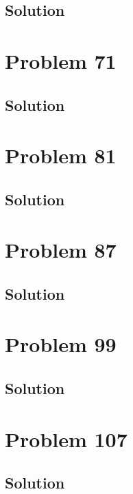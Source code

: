 \documentclass[12pt]{article}
\begin{document}
        \subsection{Solution}

    \pagebreak
    \section{Problem 71}

        \subsection{Solution}

    \pagebreak
    \section{Problem 81}

        \subsection{Solution}

    \pagebreak
    \section{Problem 87}

        \subsection{Solution}

    \pagebreak
    \section{Problem 99}

        \subsection{Solution}

    \pagebreak
    \section{Problem 107}

        \subsection{Solution}

    \pagebreak

    \tableofcontents
\end{document}
